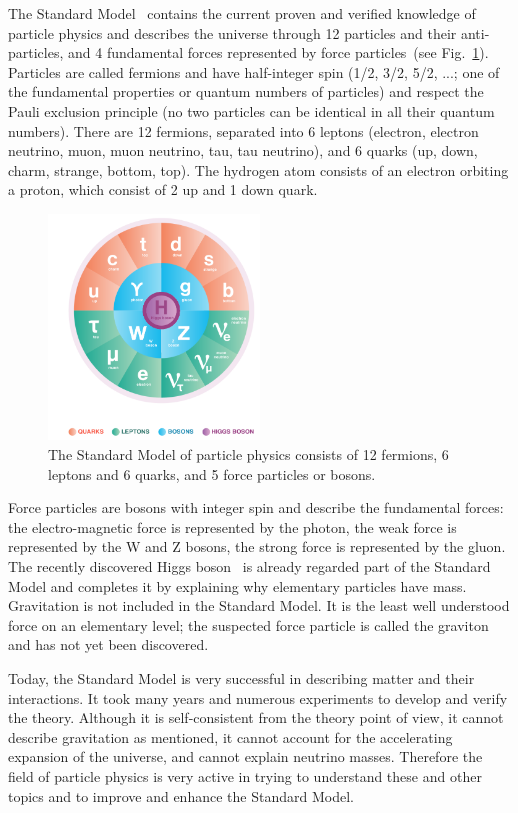 \documentclass{wscpaperproc}
\theoremstyle{wsc}
\begin{document}
The Standard Model~\cite{griffiths2008introduction} contains the current proven and verified knowledge of particle physics and describes the universe through 12 particles and their anti-particles, and 4 fundamental forces represented by force particles~(see Fig.~\ref{fig:sm}). Particles are called fermions and have half-integer spin (1/2, 3/2, 5/2, ...; one of the fundamental properties or quantum numbers of particles) and respect the Pauli exclusion principle (no two particles can be identical in all their quantum numbers). There are 12 fermions, separated into 6 leptons (electron, electron neutrino, muon, muon neutrino, tau, tau neutrino), and 6 quarks (up, down, charm, strange, bottom, top). The hydrogen atom consists of an electron orbiting a proton, which consist of 2 up and 1 down quark.

\begin{figure}[htb]
{
   \centering
   \includegraphics[width=0.50\textwidth]{StandardModel}
   \caption{The Standard Model of particle physics consists of 12 fermions, 6 leptons and 6 quarks, and 5 force particles or bosons.
   \label{fig:sm}}
}
\end{figure}

Force particles are bosons with integer spin and describe the fundamental forces: the electro-magnetic force is represented by the photon, the weak force is represented by the W and Z bosons, the strong force is represented by the gluon. The recently discovered Higgs boson~ is already regarded part of the Standard Model and completes it by explaining why elementary particles have mass. Gravitation is not included in the Standard Model. It is the least well understood force on an elementary level; the suspected force particle is called the graviton and has not yet been discovered.

Today, the Standard Model is very successful in describing matter and their interactions. It took many years and numerous experiments to develop and verify the theory. Although it is self-consistent from the theory point of view, it cannot describe gravitation as mentioned, it cannot account for the accelerating expansion of the universe, and cannot explain neutrino masses. Therefore the field of particle physics is very active in trying to understand these and other topics and to improve and enhance the Standard Model.
\end{document}

